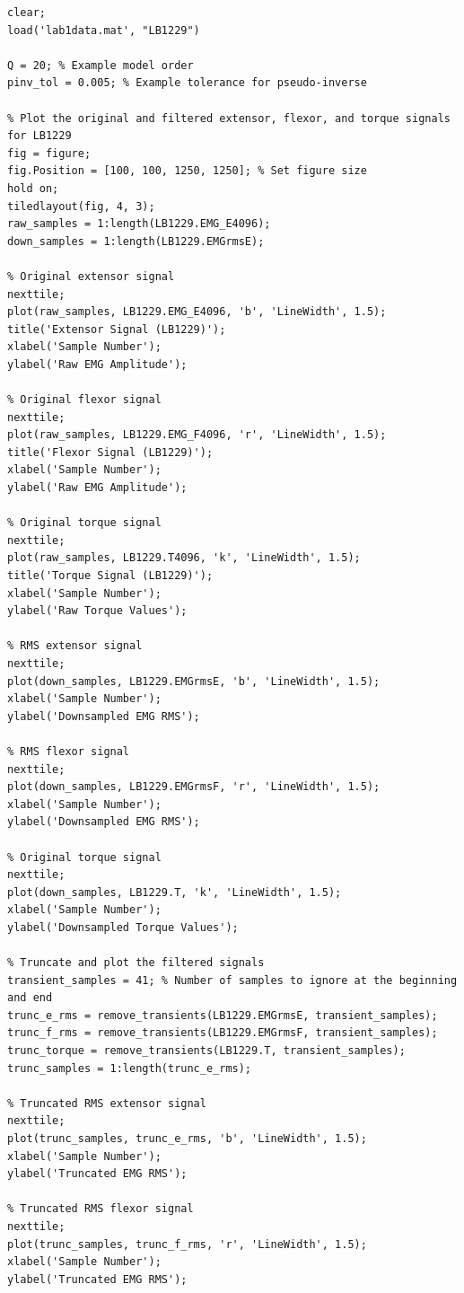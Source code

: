 \documentclass[12pt]{article}
\begin{document}
\newpage
\begin{lstlisting}[caption={generate\_training\_overview.m}]
% Generates overview of training process for Q = 20, Tol = 0.005
clear;
load('lab1data.mat', "LB1229")

Q = 20; % Example model order
pinv_tol = 0.005; % Example tolerance for pseudo-inverse

% Plot the original and filtered extensor, flexor, and torque signals for LB1229
fig = figure;
fig.Position = [100, 100, 1250, 1250]; % Set figure size
hold on;
tiledlayout(fig, 4, 3);
raw_samples = 1:length(LB1229.EMG_E4096);
down_samples = 1:length(LB1229.EMGrmsE);

% Original extensor signal
nexttile;
plot(raw_samples, LB1229.EMG_E4096, 'b', 'LineWidth', 1.5);
title('Extensor Signal (LB1229)');
xlabel('Sample Number');
ylabel('Raw EMG Amplitude');

% Original flexor signal
nexttile;
plot(raw_samples, LB1229.EMG_F4096, 'r', 'LineWidth', 1.5);
title('Flexor Signal (LB1229)');
xlabel('Sample Number');
ylabel('Raw EMG Amplitude');

% Original torque signal
nexttile;
plot(raw_samples, LB1229.T4096, 'k', 'LineWidth', 1.5);
title('Torque Signal (LB1229)');
xlabel('Sample Number');
ylabel('Raw Torque Values');

% RMS extensor signal
nexttile;
plot(down_samples, LB1229.EMGrmsE, 'b', 'LineWidth', 1.5);
xlabel('Sample Number');
ylabel('Downsampled EMG RMS');

% RMS flexor signal
nexttile;
plot(down_samples, LB1229.EMGrmsF, 'r', 'LineWidth', 1.5);
xlabel('Sample Number');
ylabel('Downsampled EMG RMS');

% Original torque signal
nexttile;
plot(down_samples, LB1229.T, 'k', 'LineWidth', 1.5);
xlabel('Sample Number');
ylabel('Downsampled Torque Values');

% Truncate and plot the filtered signals
transient_samples = 41; % Number of samples to ignore at the beginning and end
trunc_e_rms = remove_transients(LB1229.EMGrmsE, transient_samples);
trunc_f_rms = remove_transients(LB1229.EMGrmsF, transient_samples);
trunc_torque = remove_transients(LB1229.T, transient_samples);
trunc_samples = 1:length(trunc_e_rms);

% Truncated RMS extensor signal
nexttile;
plot(trunc_samples, trunc_e_rms, 'b', 'LineWidth', 1.5);
xlabel('Sample Number');
ylabel('Truncated EMG RMS');

% Truncated RMS flexor signal
nexttile;
plot(trunc_samples, trunc_f_rms, 'r', 'LineWidth', 1.5);
xlabel('Sample Number');
ylabel('Truncated EMG RMS');


\end{lstlisting}
\end{document}
